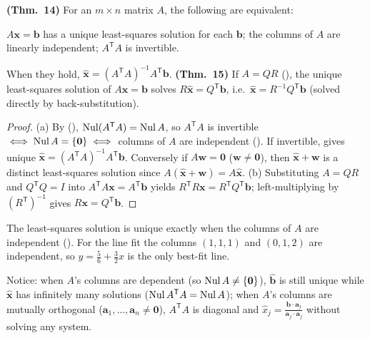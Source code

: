 \documentclass[10pt]{scrartcl}
\newcommand{\vv}[1]{\mathbf{#1}}
\begin{document}
\begin{theorem*}
  \begin{enumerate}
    \ii[(a)] \textbf{(Thm.~14)} For an $m\times n$ matrix $A$, the following are equivalent:
    \begin{enumerate}[(i)]
      \ii $A\vv x=\vv b$ has a unique least-squares solution for each $\vv b$;
      \ii the columns of $A$ are linearly independent;
      \ii $A^{\mathsf T}A$ is invertible.
    \end{enumerate}
    When they hold, $\hat{\vv x}=(A^{\mathsf T}A)^{-1}A^{\mathsf T}\vv b$.
    \ii[(b)] \textbf{(Thm.~15)} If $A=QR$ (), the unique least-squares solution of $A\vv x=\vv b$ solves $R\hat{\vv x}=Q^{\mathsf T}\vv b$, i.e.\ $\hat{\vv x}=R^{-1}Q^{\mathsf T}\vv b$ (solved directly by back-substitution).
  \end{enumerate}
\end{theorem*}
\begin{proof}
  (a) By (), $\operatorname{Nul}(A^{\mathsf T}A)=\operatorname{Nul} A$, so $A^{\mathsf T}A$ is invertible $\iff \Nul A=\{\vv 0\} \iff$ columns of $A$ are independent (). If invertible,  gives unique $\hat{\vv x}=(A^{\mathsf T}A)^{-1}A^{\mathsf T}\vv b$. Conversely if $A\vv w=\vv 0$ ($\vv w\ne\vv 0$), then $\hat{\vv x}+\vv w$ is a distinct least-squares solution since $A(\hat{\vv x}+\vv w)=A\hat{\vv x}$.
  (b) Substituting $A=QR$ and $Q^{\mathsf T}Q=I$ into $A^{\mathsf T}A\vv x=A^{\mathsf T}\vv b$ yields $R^{\mathsf T}R\vv x=R^{\mathsf T}Q^{\mathsf T}\vv b$; left-multiplying by $(R^{\mathsf T})^{-1}$ gives $R\vv x=Q^{\mathsf T}\vv b$.
\end{proof}

\revisit[ (uniqueness)] The least-squares solution is unique exactly when the columns of $A$ are independent (). For the line fit the columns $(1,1,1)$ and $(0,1,2)$ are independent, so $y=\frac56+\frac32x$ is the only best-fit line.

Notice: when $A$'s columns are dependent (so $\Nul A\neq\{\vv 0\}$), $\hat{\vv b}$ is still unique while $\hat{\vv x}$ has infinitely many solutions ($\operatorname{Nul} A^{\mathsf T}A=\operatorname{Nul} A$); when $A$'s columns are mutually orthogonal ($\vv a_1,\dots,\vv a_n\neq\vv 0$), $A^{\mathsf T}A$ is diagonal and $\hat{x}_j=\frac{\vv b\cdot\vv a_j}{\vv a_j\cdot\vv a_j}$ without solving any system.
\end{document}
